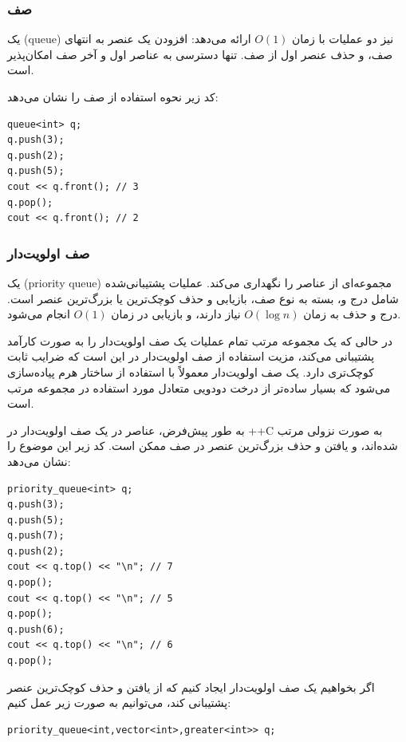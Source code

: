 \subsubsection{صف}


یک  (queue) نیز
دو عملیات با زمان $O(1)$ ارائه می‌دهد:
افزودن یک عنصر به انتهای صف،
و حذف عنصر اول از صف.
تنها دسترسی به عناصر اول
و آخر صف امکان‌پذیر است.

کد زیر نحوه استفاده از صف را نشان می‌دهد:
\begin{lstlisting}
queue<int> q;
q.push(3);
q.push(2);
q.push(5);
cout << q.front(); // 3
q.pop();
cout << q.front(); // 2
\end{lstlisting}

\subsubsection{صف اولویت‌دار}


یک  (priority queue)
مجموعه‌ای از عناصر را نگهداری می‌کند.
عملیات پشتیبانی‌شده شامل درج و،
بسته به نوع صف،
بازیابی و حذف
کوچک‌ترین یا بزرگ‌ترین عنصر است.
درج و حذف به زمان $O(\log n)$ نیاز دارند،
و بازیابی در زمان $O(1)$ انجام می‌شود.

در حالی که یک مجموعه مرتب تمام عملیات
یک صف اولویت‌دار را به صورت کارآمد پشتیبانی می‌کند،
مزیت استفاده از صف اولویت‌دار در این است
که ضرایب ثابت کوچک‌تری دارد.
یک صف اولویت‌دار معمولاً با استفاده از
ساختار هرم پیاده‌سازی می‌شود که بسیار ساده‌تر از
درخت دودویی متعادل مورد استفاده در مجموعه مرتب است.

\begin{samepage}
به طور پیش‌فرض، عناصر در یک صف اولویت‌دار
در ++C به صورت نزولی مرتب شده‌اند،
و یافتن و حذف
بزرگ‌ترین عنصر در صف ممکن است.
کد زیر این موضوع را نشان می‌دهد:

\begin{lstlisting}
priority_queue<int> q;
q.push(3);
q.push(5);
q.push(7);
q.push(2);
cout << q.top() << "\n"; // 7
q.pop();
cout << q.top() << "\n"; // 5
q.pop();
q.push(6);
cout << q.top() << "\n"; // 6
q.pop();
\end{lstlisting}
\end{samepage}

اگر بخواهیم یک صف اولویت‌دار ایجاد کنیم
که از یافتن و حذف
کوچک‌ترین عنصر پشتیبانی کند،
می‌توانیم به صورت زیر عمل کنیم:

\begin{lstlisting}
priority_queue<int,vector<int>,greater<int>> q;
\end{lstlisting}

